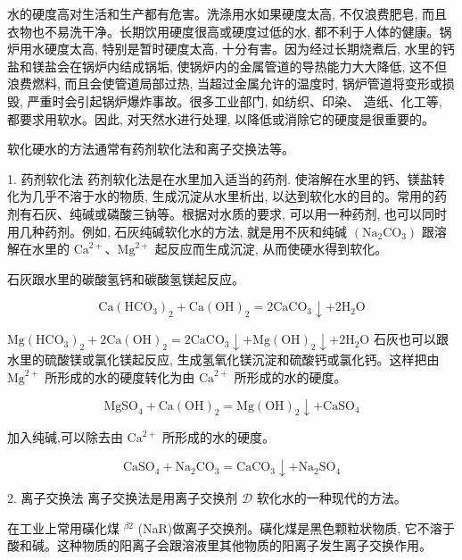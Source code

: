 \documentclass[10pt]{article}
\begin{document}
水的硬度高对生活和生产都有危害。洗涤用水如果硬度太高, 不仅浪费肥皂, 而且衣物也不易洗干净。长期饮用硬度很高或硬度过低的水, 都不利于人体的健康。锅炉用水硬度太高, 特别是暂时硬度太高, 十分有害。因为经过长期烧煮后, 水里的钙盐和镁盐会在锅炉内结成锅垢, 使锅炉内的金属管道的导热能力大大降低, 这不但浪费燃料, 而且会使管道局部过热, 当超过金属允许的温度时, 锅炉管道将变形或损毁, 严重时会引起锅炉爆炸事故。很多工业部门, 如纺织、印染、 造纸、化工等, 都要求用软水。因此, 对天然水进行处理, 以降低或消除它的硬度是很重要的。

软化硬水的方法通常有药剂软化法和离子交换法等。

1. 药剂软化法 药剂软化法是在水里加入适当的药剂. 使溶解在水里的钙、镁盐转化为几乎不溶于水的物质, 生成沉淀从水里析出, 以达到软化水的目的。常用的药剂有石灰、纯碱或磷酸三钠等。根据对水质的要求, 可以用一种药剂, 也可以同时用几种药剂。例如, 石灰纯碱软化水的方法, 就是用不灰和纯碱 \(\left( {{\mathrm{{Na}}}_{2}{\mathrm{{CO}}}_{3}}\right)\) 跟溶解在水里的 \({\mathrm{{Ca}}}^{2 + }\text{、}{\mathrm{{Mg}}}^{2 + }\) 起反应而生成沉淀, 从而使硬水得到软化。

石灰跟水里的碳酸氢钙和碳酸氢镁起反应。

\[
\mathrm{{Ca}}{\left( {\mathrm{{HCO}}}_{3}\right) }_{2} + \mathrm{{Ca}}{\left( \mathrm{{OH}}\right) }_{2} = 2{\mathrm{{CaCO}}}_{3} \downarrow + 2{\mathrm{H}}_{2}\mathrm{O}
\]

\(\mathrm{{Mg}}{\left( {\mathrm{{HCO}}}_{3}\right) }_{2} + 2\mathrm{{Ca}}{\left( \mathrm{{OH}}\right) }_{2} = 2{\mathrm{{CaCO}}}_{3} \downarrow + \mathrm{{Mg}}{\left( \mathrm{{OH}}\right) }_{2} \downarrow + 2{\mathrm{H}}_{2}\mathrm{O}\) 石灰也可以跟水里的硫酸镁或氯化镁起反应, 生成氢氧化镁沉淀和硫酸钙或氯化钙。这样把由 \({\mathrm{{Mg}}}^{2 + }\) 所形成的水的硬度转化为由 \({\mathrm{{Ca}}}^{2 + }\) 所形成的水的硬度。

\[
{\mathrm{{MgSO}}}_{4} + \mathrm{{Ca}}{\left( \mathrm{{OH}}\right) }_{2} = \mathrm{{Mg}}{\left( \mathrm{{OH}}\right) }_{2} \downarrow + {\mathrm{{CaSO}}}_{4}
\]

加入纯碱,可以除去由 \({\mathrm{{Ca}}}^{2 + }\) 所形成的水的硬度。

\[
{\mathrm{{CaSO}}}_{4} + {\mathrm{{Na}}}_{2}{\mathrm{{CO}}}_{3} = {\mathrm{{CaCO}}}_{3} \downarrow + {\mathrm{{Na}}}_{2}{\mathrm{{SO}}}_{4}
\]

2. 离子交换法 离子交换法是用离子交换剂 \(\mathcal{D}\) 软化水的一种现代的方法。

在工业上常用磺化煤 \({}^{\beta 2}\) (NaR)做离子交换剂。磺化煤是黑色颗粒状物质, 它不溶于酸和碱。这种物质的阳离子会跟溶液里其他物质的阳离子发生离子交换作用。
\end{document}
